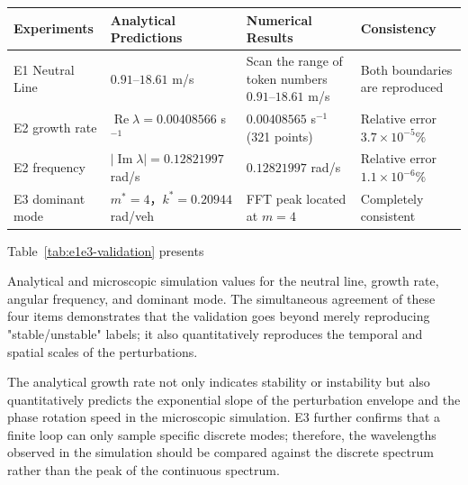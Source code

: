 \documentclass[11pt,a4paper,openany]{book}
\numberwithin{equation}{chapter}
\numberwithin{figure}{chapter}
\numberwithin{table}{chapter}
\newcommand{\tabletext}[2]{%
  \par\smallskip\noindent
  Table~\ref{#1} presents #2
\par\smallskip
}
\begin{document}
\begin{center}
\small
{}
\label{tab:e1e3-validation}
\begin{tabular}{p{2.0cm}p{3.6cm}p{3.6cm}p{3.2cm}}
\toprule
\textbf{Experiments} & \textbf{Analytical Predictions} & \textbf{Numerical Results} & \textbf{Consistency} \\
\midrule


E1 Neutral Line




& $0.91$--$18.61$ m/s &




 Scan the range of token numbers $0.91$--$18.61$ m/s




&




 Both boundaries are reproduced




\\[3pt]
E2 growth rate

& $\operatorname{Re}\lambda=0.00408566$ s$^{-1}$ &

$0.00408565$ s$^{-1}$ (321 points)

&

Relative error $3.7\times10^{-5}\%$
\\[3pt]
E2 frequency

& $|\operatorname{Im}\lambda|=0.12821997$ rad/s & $0.12821997$ rad/s &

Relative error $1.1\times10^{-6}\%$
\\[3pt]
E3 dominant mode

& $m^*=4$，$k^*=0.20944$ rad/veh &

FFT peak located at $m=4$

&

Completely consistent
\\
\bottomrule
\end{tabular}
\end{center}
\tabletext{tab:e1e3-validation}{

Analytical and microscopic simulation values for the neutral line, growth rate, angular frequency, and dominant mode. The simultaneous agreement of these four items demonstrates that the validation goes beyond merely reproducing "stable/unstable" labels; it also quantitatively reproduces the temporal and spatial scales of the perturbations.
}

\begin{tcolorbox}[resultbox,title=\textbf{Validation conclusion}]
The analytical growth rate not only indicates stability or instability but also quantitatively predicts the exponential slope of the perturbation envelope and the phase rotation speed in the microscopic simulation. E3 further confirms that a finite loop can only sample specific discrete modes; therefore, the wavelengths observed in the simulation should be compared against the discrete spectrum rather than the peak of the continuous spectrum.


\end{tcolorbox}
\end{document}
